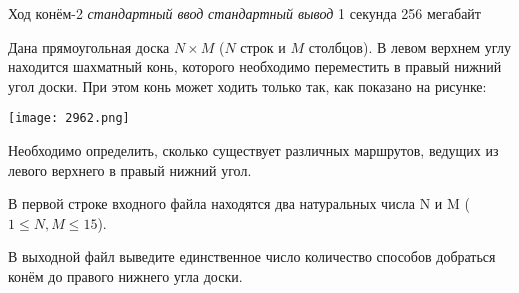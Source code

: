 \graphicspath{ {./images/} }
\begin{problem}%
{Ход конём-2}%
{\textsl{стандартный ввод}}%
{\textsl{стандартный вывод}}%
{1 секунда}%
{256 мегабайт}{}

Дана прямоугольная доска $N \times M$ ($N$ строк и $M$ столбцов). В левом верхнем углу находится шахматный конь, которого необходимо переместить в правый нижний угол доски. При этом конь может ходить только так, как показано на рисунке:

\begin{center}
\texttt{[image: 2962.png]}
\end{center}

Необходимо определить, сколько существует различных маршрутов, ведущих из левого верхнего в правый нижний угол.

\InputFile

В первой строке входного файла находятся два натуральных числа N и M ($1 \le N, M \le 15$).  

\OutputFile

В выходной файл выведите единственное число количество способов добраться конём до правого нижнего угла доски.

\Examples

\begin{example}
%
%
\end{example}
\end{problem}

